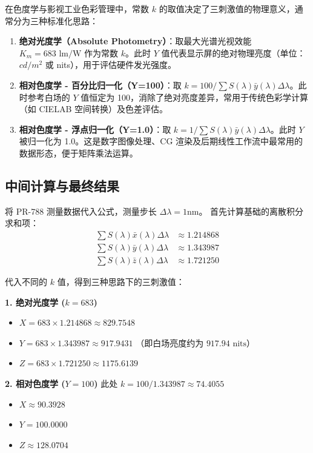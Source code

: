 \documentclass[12pt, a4paper]{ctexart}
\begin{document}
在色度学与影视工业色彩管理中，常数 $k$ 的取值决定了三刺激值的物理意义，通常分为三种标准化思路：
\begin{enumerate}
    \item \textbf{绝对光度学（Absolute Photometry）}：取最大光谱光视效能 $K_m = 683 \text{ lm/W}$ 作为常数 $k$。此时 $Y$ 值代表显示屏的绝对物理亮度（单位：$cd/m^2$ 或 nits），用于评估硬件发光强度。
    \item \textbf{相对色度学 - 百分比归一化（Y=100）}：取 $k = 100 / \sum S(\lambda) \bar{y}(\lambda) \Delta\lambda$。此时参考白场的 $Y$ 值恒定为 100，消除了绝对亮度差异，常用于传统色彩学计算（如 CIELAB 空间转换）及色差评估。
    \item \textbf{相对色度学 - 浮点归一化（Y=1.0）}：取 $k = 1 / \sum S(\lambda) \bar{y}(\lambda) \Delta\lambda$。此时 $Y$ 被归一化为 1.0。这是数字图像处理、CG 渲染及后期线性工作流中最常用的数据形态，便于矩阵乘法运算。
\end{enumerate}

\subsection{中间计算与最终结果}
将 PR-788 测量数据代入公式，测量步长 $\Delta\lambda = 1\text{nm}$。
首先计算基础的离散积分求和项：
\begin{align*}
    \sum S(\lambda) \bar{x}(\lambda) \Delta\lambda &\approx 1.214868 \\
    \sum S(\lambda) \bar{y}(\lambda) \Delta\lambda &\approx 1.343987 \\
    \sum S(\lambda) \bar{z}(\lambda) \Delta\lambda &\approx 1.721250
\end{align*}

代入不同的 $k$ 值，得到三种思路下的三刺激值：

\noindent\textbf{1. 绝对光度学 ($k=683$)}
\begin{itemize}
    \item $X = 683 \times 1.214868 \approx \mathbf{829.7548}$
    \item $Y = 683 \times 1.343987 \approx \mathbf{917.9431}$ （即白场亮度约为 $917.94 \text{ nits}$）
    \item $Z = 683 \times 1.721250 \approx \mathbf{1175.6139}$
\end{itemize}

\noindent\textbf{2. 相对色度学 ($Y=100$)} 
此处 $k = 100 / 1.343987 \approx 74.4055$
\begin{itemize}
    \item $X \approx \mathbf{90.3928}$
    \item $Y = \mathbf{100.0000}$ 
    \item $Z \approx \mathbf{128.0704}$
\end{itemize}
\end{document}
